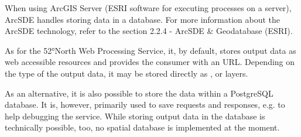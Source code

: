 When using ArcGIS Server (ESRI software for executing processes on a
server), ArcSDE handles storing data in a database. For more
information about the ArcSDE technology, refer to the section 2.2.4 -
ArcSDE \& Geodatabase (ESRI).

As for the 52°North Web Processing Service, it, by default, stores output data as
web accessible resources and provides the consumer with an
URL. Depending on the type of the output data, it may be stored
directly as ,  or  layers. \cite{north} 

As an alternative, it is also possible to store the data within a PostgreSQL database. \cite{52north} It is, however, primarily used to save requests and responses, e.g. to help debugging the service. While storing output data in the database is technically possible, too, no spatial database is implemented at the moment.\cite{pros}


